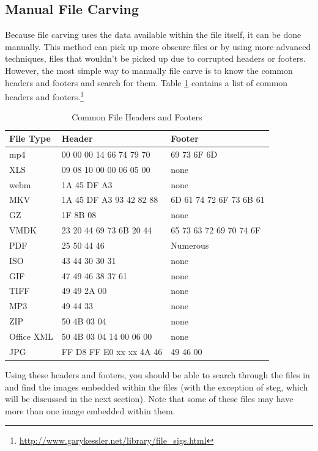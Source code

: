 		\subsection{Manual File Carving}
			Because file carving uses the data available within the file itself, it can be done manually.
			This method can pick up more obscure files or by using more advanced techniques, files that wouldn't be picked up due to corrupted headers or footers.
			However, the most simple way to manually file carve is to know the common headers and footers and search for them.
			Table \ref{tab:FileCarvingHeaders} contains a list of common headers and footers.\footnote{\url{http://www.garykessler.net/library/file\_sigs.html}}
			\begin{table}[htb]
				\centering
				\begin{adjustbox}{max width=1\textwidth}
				\begin{tabular}{lll}
					\toprule
					\textbf{File Type} & \textbf{Header} & \textbf{Footer} \\
					\toprule
					mp4	& 00 00 00 14 66 74 79 70	& 69 73 6F 6D \\
					XLS	& 09 08 10 00 00 06 05 00	& none \\
					webm& 1A 45 DF A3				& none \\
					MKV & 1A 45 DF A3 93 42 82 88	& 6D 61 74 72 6F 73 6B 61 \\
					GZ	& 1F 8B 08					& none \\
					VMDK& 23 20 44 69 73 6B 20 44	& 65 73 63 72 69 70 74 6F \\
					PDF & 25 50 44 46				& Numerous \\
					ISO	& 43 44 30 30 31			& none \\
					GIF & 47 49 46 38 37 61			& none \\
					TIFF& 49 49 2A 00				& none \\
					MP3	& 49 44 33					& none \\
					ZIP & 50 4B 03 04				& none \\
					Office XML & 50 4B 03 04 14 00 06 00 & none \\
					JPG & FF D8 FF E0 xx xx 4A 46	& 49 46 00 \\
					\bottomrule
				\end{tabular}
			\end{adjustbox}
				\caption{Common File Headers and Footers}
				\label{tab:FileCarvingHeaders}
			\end{table}
			Using these headers and footers, you should be able to search through the files in  %
			and find the images embedded within the files (with the exception of steg, which will be discussed in the next section).
			Note that some of these files may have more than one image embedded within them.

